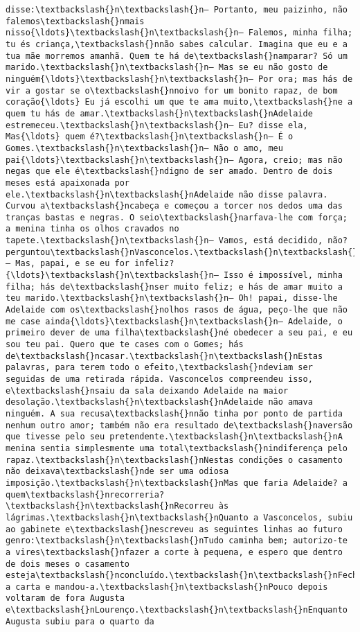 \begin{Verbatim}[commandchars=\\\{\}]
disse:\textbackslash{}n\textbackslash{}n— Portanto, meu paizinho, não falemos\textbackslash{}nmais nisso{\ldots}\textbackslash{}n\textbackslash{}n— Falemos, minha filha; tu és criança,\textbackslash{}nnão sabes calcular. Imagina que eu e a tua mãe morremos amanhã. Quem te há de\textbackslash{}namparar? Só um marido.\textbackslash{}n\textbackslash{}n— Mas se eu não gosto de ninguém{\ldots}\textbackslash{}n\textbackslash{}n— Por ora; mas hás de vir a gostar se o\textbackslash{}nnoivo for um bonito rapaz, de bom coração{\ldots} Eu já escolhi um que te ama muito,\textbackslash{}ne a quem tu hás de amar.\textbackslash{}n\textbackslash{}nAdelaide estremeceu.\textbackslash{}n\textbackslash{}n— Eu? disse ela, Mas{\ldots} quem é?\textbackslash{}n\textbackslash{}n— É o Gomes.\textbackslash{}n\textbackslash{}n— Não o amo, meu pai{\ldots}\textbackslash{}n\textbackslash{}n— Agora, creio; mas não negas que ele é\textbackslash{}ndigno de ser amado. Dentro de dois meses está apaixonada por ele.\textbackslash{}n\textbackslash{}nAdelaide não disse palavra. Curvou a\textbackslash{}ncabeça e começou a torcer nos dedos uma das tranças bastas e negras. O seio\textbackslash{}narfava-lhe com força; a menina tinha os olhos cravados no tapete.\textbackslash{}n\textbackslash{}n— Vamos, está decidido, não? perguntou\textbackslash{}nVasconcelos.\textbackslash{}n\textbackslash{}n— Mas, papai, e se eu for infeliz?{\ldots}\textbackslash{}n\textbackslash{}n— Isso é impossível, minha filha; hás de\textbackslash{}nser muito feliz; e hás de amar muito a teu marido.\textbackslash{}n\textbackslash{}n— Oh! papai, disse-lhe Adelaide com os\textbackslash{}nolhos rasos de água, peço-lhe que não me case ainda{\ldots}\textbackslash{}n\textbackslash{}n— Adelaide, o primeiro dever de uma filha\textbackslash{}né obedecer a seu pai, e eu sou teu pai. Quero que te cases com o Gomes; hás de\textbackslash{}ncasar.\textbackslash{}n\textbackslash{}nEstas palavras, para terem todo o efeito,\textbackslash{}ndeviam ser seguidas de uma retirada rápida. Vasconcelos compreendeu isso, e\textbackslash{}nsaiu da sala deixando Adelaide na maior desolação.\textbackslash{}n\textbackslash{}nAdelaide não amava ninguém. A sua recusa\textbackslash{}nnão tinha por ponto de partida nenhum outro amor; também não era resultado de\textbackslash{}naversão que tivesse pelo seu pretendente.\textbackslash{}n\textbackslash{}nA menina sentia simplesmente uma total\textbackslash{}nindiferença pelo rapaz.\textbackslash{}n\textbackslash{}nNestas condições o casamento não deixava\textbackslash{}nde ser uma odiosa imposição.\textbackslash{}n\textbackslash{}nMas que faria Adelaide? a quem\textbackslash{}nrecorreria?\textbackslash{}n\textbackslash{}nRecorreu às lágrimas.\textbackslash{}n\textbackslash{}nQuanto a Vasconcelos, subiu ao gabinete e\textbackslash{}nescreveu as seguintes linhas ao futuro genro:\textbackslash{}n\textbackslash{}nTudo caminha bem; autorizo-te a vires\textbackslash{}nfazer a corte à pequena, e espero que dentro de dois meses o casamento esteja\textbackslash{}nconcluído.\textbackslash{}n\textbackslash{}nFechou a carta e mandou-a.\textbackslash{}n\textbackslash{}nPouco depois voltaram de fora Augusta e\textbackslash{}nLourenço.\textbackslash{}n\textbackslash{}nEnquanto Augusta subiu para o quarto da 
\end{Verbatim}

